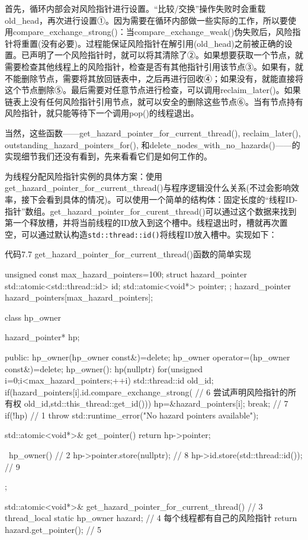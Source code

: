 首先，循环内部会对风险指针进行设置。“比较/交换”操作失败时会重载old\_head，再次进行设置①。因为需要在循环内部做一些实际的工作，所以要使用compare\_exchange\_strong()：当compare\_exchange\_weak()伪失败后，风险指针将重置(没有必要)。过程能保证风险指针在解引用(old\_head)之前被正确的设置。已声明了一个风险指针时，就可以将其清除了②。如果想要获取一个节点，就需要检查其他线程上的风险指针，检查是否有其他指针引用该节点③。如果有，就不能删除节点，需要将其放回链表中，之后再进行回收④；如果没有，就能直接将这个节点删除⑤。最后需要对任意节点进行检查，可以调用reclaim\_later()。如果链表上没有任何风险指针引用节点，就可以安全的删除这些节点⑥。当有节点持有风险指针，就只能等待下一个调用pop()的线程退出。

当然，这些函数——get\_hazard\_pointer\_for\_current\_thread(), reclaim\_later(), outstanding\_hazard\_pointers\_for(), 和delete\_nodes\_with\_no\_hazards()——的实现细节我们还没有看到，先来看看它们是如何工作的。

为线程分配风险指针实例的具体方案：使用get\_hazard\_pointer\_for\_current\_thread()与程序逻辑没什么关系(不过会影响效率，接下会看到具体的情况)。可以使用一个简单的结构体：固定长度的“线程ID-指针”数组。get\_hazard\_pointer\_for\_curent\_thread()可以通过这个数据来找到第一个释放槽，并将当前线程的ID放入到这个槽中。线程退出时，槽就再次置空，可以通过默认构造\texttt{std::thread::id()}将线程ID放入槽中。实现如下：

代码7.7 get\_hazard\_pointer\_for\_current\_thread()函数的简单实现

\begin{cpp}
unsigned const max_hazard_pointers=100;
struct hazard_pointer
{
  std::atomic<std::thread::id> id;
  std::atomic<void*> pointer;
};
hazard_pointer hazard_pointers[max_hazard_pointers];

class hp_owner
{
  hazard_pointer* hp;

public:
  hp_owner(hp_owner const&)=delete;
  hp_owner operator=(hp_owner const&)=delete;
  hp_owner():
    hp(nullptr)
  {
    for(unsigned i=0;i<max_hazard_pointers;++i)
    {
      std::thread::id old_id;
      if(hazard_pointers[i].id.compare_exchange_strong(  // 6 尝试声明风险指针的所有权
         old_id,std::this_thread::get_id()))
      {
        hp=&hazard_pointers[i];
        break;  // 7
      }
    }
    if(!hp)  // 1
    {
      throw std::runtime_error("No hazard pointers available");
    }
  }

  std::atomic<void*>& get_pointer()
  {
    return hp->pointer;
  }

  ~hp_owner()  // 2
  {
    hp->pointer.store(nullptr);  // 8
    hp->id.store(std::thread::id());  // 9
  }
};

std::atomic<void*>& get_hazard_pointer_for_current_thread()  // 3
{
  thread_local static hp_owner hazard;  // 4 每个线程都有自己的风险指针
  return hazard.get_pointer();  // 5
}
\end{cpp}

